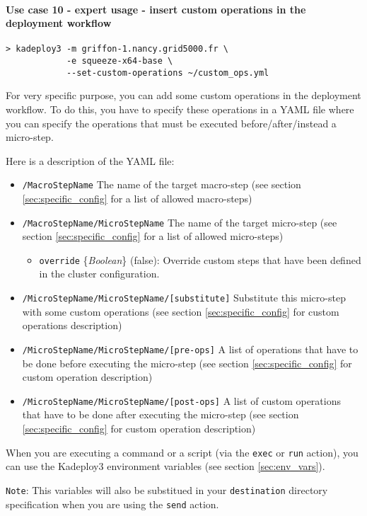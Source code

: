 \documentclass[a4wide,10pt,oneside]{book}
\newcommand{\ypath}[1]{\texttt{#1}}
\newcommand{\yfieldd}[3]{\texttt{#1} {\small\{{\emph{#2}}\}} {\small(}#3{\small)}:}
\begin{document}
\paragraph{Use case 10 - expert usage - insert custom operations in the deployment workflow}
\begin{verbatim}
> kadeploy3 -m griffon-1.nancy.grid5000.fr \
            -e squeeze-x64-base \
            --set-custom-operations ~/custom_ops.yml
\end{verbatim}
For very specific purpose, you can add some custom operations in the deployment workflow. To do this, you have to specify these operations in a YAML file where you can specify the operations that must be executed before/after/instead a micro-step.

Here is a description of the YAML file:
\begin{itemize}
  \item \ypath{/MacroStepName} The name of the target macro-step (see section \ref{sec:specific_config} for a list of allowed macro-steps)
  \item \ypath{/MacroStepName/MicroStepName} The name of the target micro-step (see section \ref{sec:specific_config} for a list of allowed micro-steps)
  \begin{itemize}
    \item \yfieldd{override}{Boolean}{false} Override custom steps that have been defined in the cluster configuration.
  \end{itemize}
  \item \ypath{/MicroStepName/MicroStepName/[substitute]} Substitute this micro-step with some custom operations (see section \ref{sec:specific_config} for custom operations description)
  \item \ypath{/MicroStepName/MicroStepName/[pre-ops]} A list of operations that have to be done before executing the micro-step (see section \ref{sec:specific_config} for custom operation description)
  \item \ypath{/MicroStepName/MicroStepName/[post-ops]} A list of custom operations that have to be done after executing the micro-step (see section \ref{sec:specific_config} for custom operation description)
\end{itemize}

When you are executing a command or a script (via the \texttt{exec} or \texttt{run} action), you can use the Kadeploy3 environment variables (see section \ref{sec:env_vars}).

\texttt{Note}: This variables will also be substitued in your \texttt{destination} directory specification when you are using the \texttt{send} action.
\end{document}
